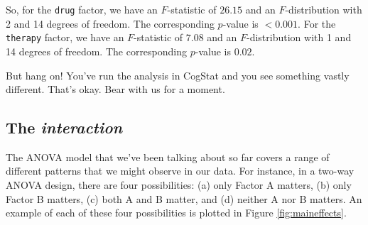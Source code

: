 \documentclass[
  11pt,
  a4paper,
  twoside,symmetric,openright]{book}
\theoremstyle{break}
\theoremstyle{break}
\begin{document}
So, for the \texttt{drug} factor, we have an \(F\)-statistic of \(26.15\) and an \(F\)-distribution with 2 and 14 degrees of freedom. The corresponding \(p\)-value is \(<0.001\). For the \texttt{therapy} factor, we have an \(F\)-statistic of \(7.08\) and an \(F\)-distribution with 1 and 14 degrees of freedom. The corresponding \(p\)-value is \(0.02\).

But hang on! You've run the analysis in CogStat and you see something vastly different. That's okay. Bear with us for a moment.

\subsection{\texorpdfstring{The \emph{interaction}}{The interaction}}\label{the-interaction}

The ANOVA model that we've been talking about so far covers a range of different patterns that we might observe in our data. For instance, in a two-way ANOVA design, there are four possibilities: (a) only Factor A matters, (b) only Factor B matters, (c) both A and B matter, and (d) neither A nor B matters. An example of each of these four possibilities is plotted in Figure \ref{fig:maineffects}.
\end{document}
